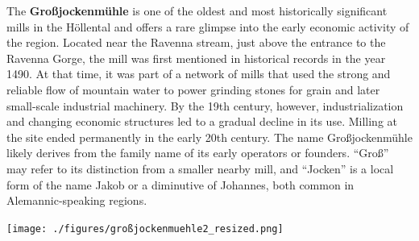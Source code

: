 \documentclass[landscape, a4paper]{article}
\newcommand\alert[1]{\textcolor{PrimaryColor}{\textbf{#1}}}
\begin{document}
\begin{minipage}[t]{0.31\textwidth}
{		%



		The \alert{Großjockenmühle} is one of the oldest and most historically significant mills in the Höllental and offers a rare glimpse into the early economic activity of the region. Located near the Ravenna stream, just above the entrance to the Ravenna Gorge, the mill was first mentioned in historical records in the year 1490. At that time, it was part of a network of mills that used the strong and reliable flow of mountain water to power grinding stones for grain and later small-scale industrial machinery. By the 19th century, however, industrialization and changing economic structures led to a gradual decline in its use. Milling at the site ended permanently in the early 20th century. The name Großjockenmühle likely derives from the family name of its early operators or founders. \enquote{Groß} may refer to its distinction from a smaller nearby mill, and \enquote{Jocken} is a local form of the name Jakob or a diminutive of Johannes, both common in Alemannic-speaking regions. %


	}{
	}

	\texttt{[image: ./figures/großjockenmuehle2\_resized.png]}
	\setlength{\parskip}{0.25cm}


\end{minipage}
\end{document}
